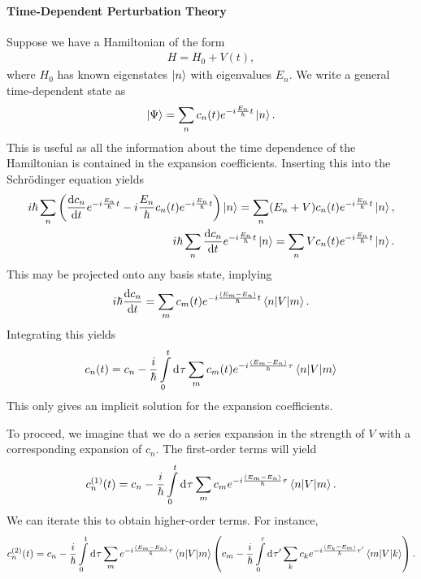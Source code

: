 \paragraph{Time-Dependent Perturbation Theory}
Suppose we have a Hamiltonian of the form
\begin{align*}
	H = H_{0} + V(t),
\end{align*}
where $H_{0}$ has known eigenstates $\ket{n}$ with eigenvalues $E_{n}$. We write a general time-dependent state as
\begin{align*}
	\ket{\Psi} = \sum\limits_{n}c_{n}(t)e^{-i\frac{E_{n}}{\hbar}t}\ket{n}.
\end{align*}
This is useful as all the information about the time dependence of the Hamiltonian is contained in the expansion coefficients. Inserting this into the Schrödinger equation yields
\begin{align*}
	i\hbar\sum\limits_{n}\left(\dv{c_{n}}{t}e^{-i\frac{E_{n}}{\hbar}t} -  i\frac{E_{n}}{\hbar}c_{n}(t)e^{-i\frac{E_{n}}{\hbar}t}\right)\ket{n} = \sum\limits_{n}(E_{n} + V)c_{n}(t)e^{-i\frac{E_{n}}{\hbar}t}\ket{n}, \\
	i\hbar\sum\limits_{n}\dv{c_{n}}{t}e^{-i\frac{E_{n}}{\hbar}t} \ket{n} = \sum\limits_{n}Vc_{n}(t)e^{-i\frac{E_{n}}{\hbar}t}\ket{n}.
\end{align*}
This may be projected onto any basis state, implying
\begin{align*}
	i\hbar\dv{c_{n}}{t} = \sum\limits_{m}c_{m}(t)e^{-i\frac{(E_{m} - E_{n})}{\hbar}t}\mel{n}{V}{m}.
\end{align*}
Integrating this yields
\begin{align*}
	c_{n}(t) = c_{n} - \frac{i}{\hbar}\int\limits_{0}^{t}\dd[]{\tau}\sum\limits_{m}c_{m}(t)e^{-i\frac{(E_{m} - E_{n})}{\hbar}\tau}\mel{n}{V}{m}
\end{align*}
This only gives an implicit solution for the expansion coefficients.

To proceed, we imagine that we do a series expansion in the strength of $V$ with a corresponding expansion of $c_{n}$. The first-order terms will yield
\begin{align*}
	c_{n}^{(1)}(t) = c_{n} - \frac{i}{\hbar}\int\limits_{0}^{t}\dd[]{\tau}\sum\limits_{m}c_{m}e^{-i\frac{(E_{m} - E_{n})}{\hbar}\tau}\mel{n}{V}{m}.
\end{align*}
We can iterate this to obtain higher-order terms. For instance,
\begin{align*}
	c_{n}^{(2)}(t) = c_{n} - \frac{i}{\hbar}\int\limits_{0}^{t}\dd[]{\tau}\sum\limits_{m}e^{-i\frac{(E_{m} - E_{n})}{\hbar}\tau}\mel{n}{V}{m}\left(c_{m} - \frac{i}{\hbar}\int\limits_{0}^{\tau}\dd[]{\tau^{\prime}}\sum\limits_{k}c_{k}e^{-i\frac{(E_{k} - E_{m})}{\hbar}\tau^{\prime}}\mel{m}{V}{k}\right).
\end{align*}

